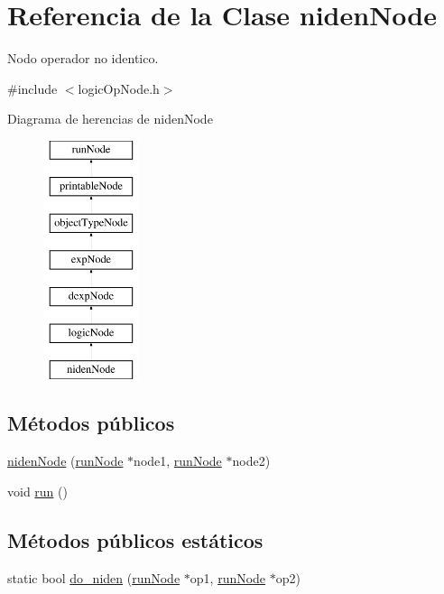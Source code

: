 \hypertarget{classnidenNode}{\section{Referencia de la Clase niden\-Node}
\label{classnidenNode}
}


Nodo operador no identico.  




{\ttfamily \#include $<$logic\-Op\-Node.\-h$>$}

Diagrama de herencias de niden\-Node\begin{figure}[H]
\begin{center}
\leavevmode
\includegraphics[height=7.000000cm]{classnidenNode}
\end{center}
\end{figure}
\subsection*{Métodos públicos}
\begin{DoxyCompactItemize}
\item 
\hyperlink{classnidenNode_a2977be762f52ed61efe495c037657461}{niden\-Node} (\hyperlink{classrunNode}{run\-Node} $\ast$node1, \hyperlink{classrunNode}{run\-Node} $\ast$node2)
\item 
void \hyperlink{classnidenNode_afa39f3a84cd19576a8cdc9d08e482186}{run} ()
\end{DoxyCompactItemize}
\subsection*{Métodos públicos estáticos}
\begin{DoxyCompactItemize}
\item 
static bool \hyperlink{classnidenNode_ab795f47b92d1cdf459b37328c09481a6}{do\-\_\-niden} (\hyperlink{classrunNode}{run\-Node} $\ast$op1, \hyperlink{classrunNode}{run\-Node} $\ast$op2)
\end{DoxyCompactItemize}
